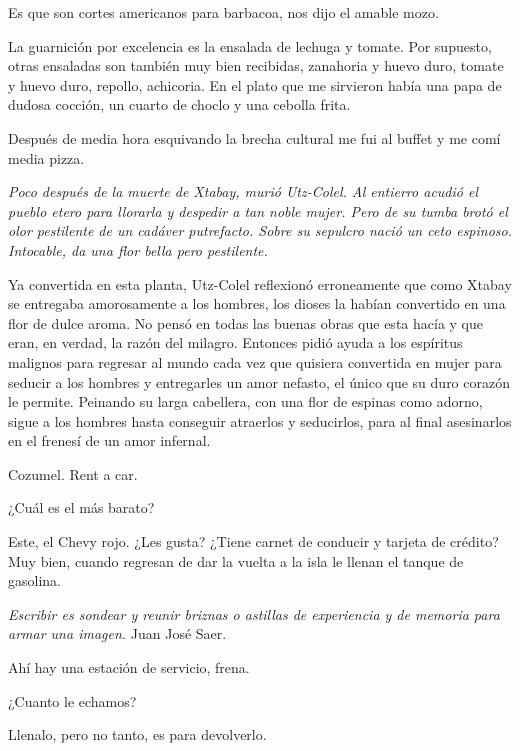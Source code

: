 \documentclass[11pt,twoside,openright,a6paper]{book}
\begin{document}
Es que son cortes americanos para barbacoa, nos dijo el amable mozo.

La guarnición por excelencia es la ensalada de lechuga y tomate. Por supuesto, otras ensaladas son también muy bien recibidas, zanahoria y huevo duro, tomate y huevo duro, repollo, achicoria. En el plato que me sirvieron había una papa de dudosa cocción, un cuarto de choclo y una cebolla frita.

Después de media hora esquivando la brecha cultural me fui al buffet y me comí media pizza.


\vspace{1.5cm}
{\em Poco después de la muerte de Xtabay, murió Utz-Colel. Al entierro acudió el pueblo etero para llorarla y despedir a tan noble mujer. Pero de su tumba brotó el olor pestilente de un cadáver putrefacto. Sobre su sepulcro nació un ceto espinoso. Intocable, da una flor bella pero pestilente.

Ya convertida en esta planta, Utz-Colel reflexionó erroneamente que como Xtabay se entregaba amorosamente a los hombres, los dioses la habían convertido en una flor de dulce aroma. No pensó en todas las buenas obras que esta hacía y que eran, en verdad, la razón del milagro. Entonces pidió ayuda a los espíritus malignos para  regresar al mundo cada vez que quisiera convertida en mujer para seducir a los hombres y entregarles un amor nefasto, el único que su duro corazón le permite. Peinando su larga cabellera, con una flor de espinas como adorno, sigue a los hombres hasta conseguir atraerlos y seducirlos, para al final asesinarlos en el frenesí de un amor infernal.}


\vspace{1.5cm}
Cozumel. Rent a car.

¿Cuál es el más barato?

Este, el Chevy rojo. ¿Les gusta? ¿Tiene carnet de conducir y tarjeta de crédito? Muy bien, cuando regresan de dar la vuelta a la isla le llenan el tanque de gasolina.


\vspace{1.5cm}
\emph{Escribir es sondear y reunir briznas o astillas de experiencia y de memoria para armar una imagen.} Juan José Saer.


\vspace{1.5cm}
Ahí hay una estación de servicio, frena.

¿Cuanto le echamos?

Llenalo, pero no tanto, es para devolverlo.
\end{document}
